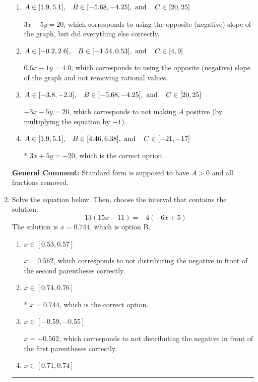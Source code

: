 \documentclass{extbook}[14pt]
\newcommand{\litem}[1]{\item #1

\rule{\textwidth}{0.4pt}}
\begin{document}
\begin{enumerate}
{\begin{enumerate}[label=\Alph*.]
 $0.6x + 1y = -4.0$, which corresponds to not removing rational values for Standard Form.
\item \( A \in [1.9, 5.1], \hspace{3mm} B \in [-5.68, -4.25], \text{ and } \hspace{3mm} C \in [20, 25] \)

 $3x - 5y = 20$, which corresponds to using the opposite (negative) slope of the graph, but did everything else correctly.
\item \( A \in [-0.2, 2.6], \hspace{3mm} B \in [-1.54, 0.53], \text{ and } \hspace{3mm} C \in [4, 9] \)

 $0.6x - 1y = 4.0$, which corresponds to using the opposite (negative) slope of the graph and not removing rational values.
\item \( A \in [-3.8, -2.3], \hspace{3mm} B \in [-5.68, -4.25], \text{ and } \hspace{3mm} C \in [20, 25] \)

 $-3x - 5y = 20$, which corresponds to not making $A$ positive (by multiplying the equation by $-1$).
\item \( A \in [1.9, 5.1], \hspace{3mm} B \in [4.46, 6.38], \text{ and } \hspace{3mm} C \in [-21, -17] \)

* $3x + 5y = -20$, which is the correct option.
\end{enumerate}

\textbf{General Comment:} Standard form is supposed to have $A > 0$ and all fractions removed.
}
\litem{
Solve the equation below. Then, choose the interval that contains the solution.
\[ -13(15x -11) = -4(-6x + 5) \]The solution is \( x = 0.744 \), which is option B.\begin{enumerate}[label=\Alph*.]
\item \( x \in [0.53, 0.57] \)

$x = 0.562$, which corresponds to not distributing the negative in front of the second parentheses correctly.
\item \( x \in [0.74, 0.76] \)

* $x = 0.744$, which is the correct option.
\item \( x \in [-0.59, -0.55] \)

$x = -0.562$, which corresponds to not distributing the negative in front of the first parentheses correctly.
\item \( x \in [0.71, 0.74] \)


\end{enumerate}}
\end{enumerate}
\end{document}
